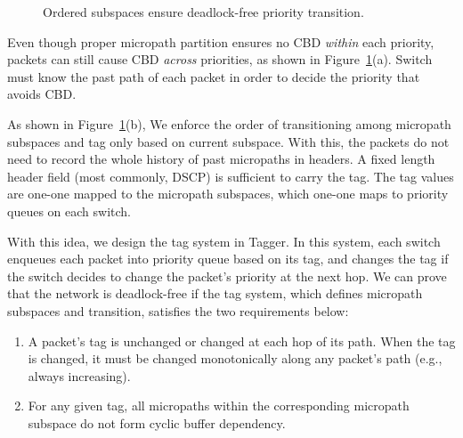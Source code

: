 \begin{figure}[t]
	\centering
	
	
	\caption{Ordered subspaces ensure deadlock-free priority transition.}\label{fig:subspace}
\end{figure}


Even though proper micropath partition ensures no CBD {\em within} each priority, packets can still cause CBD
{\em across} priorities, as shown in Figure~\ref{fig:subspace}(a). Switch must know the past path of each packet in order to decide the priority that avoids CBD.

As shown in Figure~\ref{fig:subspace}(b), We enforce the order of transitioning among micropath subspaces and tag only based on current subspace.
With this, the packets do not need to record the whole history of past micropaths in headers. A fixed length 
header field (most commonly, DSCP) is sufficient to carry the tag. The tag values are one-one mapped to the micropath subspaces,
which one-one maps to priority queues on each switch. 

With this idea, we design the tag system in Tagger. In this system, each switch enqueues each packet into priority queue based
on its tag, and changes the tag if the switch decides to change the packet's priority at the next hop.
We can prove that the network is deadlock-free if the tag system, which defines micropath subspaces and transition, 
satisfies the two requirements below:

\begin{enumerate}

	\item A packet's tag is unchanged or changed at each hop of its path. When the tag is changed, it must be changed monotonically 
	along any packet's path (e.g., always increasing).

	\item For any given tag, all micropaths within the corresponding micropath subspace do not form cyclic buffer dependency.

\end{enumerate}

